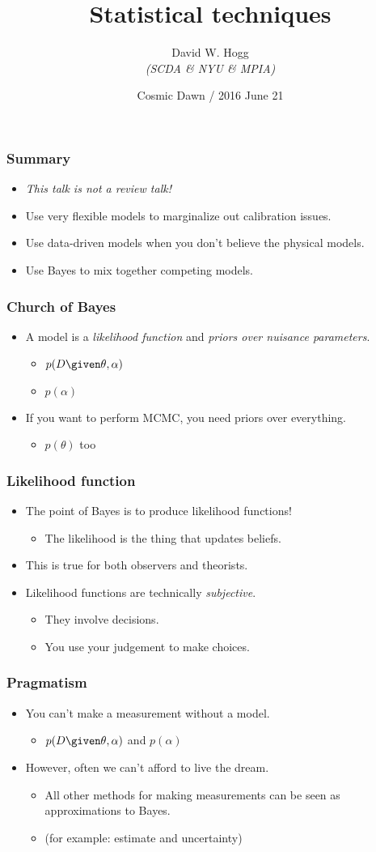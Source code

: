 \documentclass[pdftex]{beamer}
\title{Statistical techniques}
\author[David W. Hogg (NYU)]{David W. Hogg\\[1ex] {\small \textsl{(SCDA \& NYU \& MPIA)}}}
\date{Cosmic Dawn / 2016 June 21}
\newcommand{\conclusions}{%
\begin{frame}
  \frametitle{Summary}
  \begin{itemize}
  \item \textit{This talk is not a review talk!}
  \item Use very flexible models to marginalize out calibration issues.
  \item Use data-driven models when you don't believe the physical models.
  \item Use Bayes to mix together competing models.
  \end{itemize}
\end{frame}}
\begin{document}
\begin{frame}
  \titlepage
\end{frame}

\conclusions

\begin{frame}
  \frametitle{Church of Bayes}
  \begin{itemize}
  \item A model is a \emph{likelihood function} and \emph{priors over nuisance parameters}.
    \begin{itemize}
    \item $p(D\given\theta,\alpha)$
    \item $p(\alpha)$
    \end{itemize}
  \item If you want to perform MCMC, you need priors over everything.
    \begin{itemize}
    \item $p(\theta)$ too
    \end{itemize}
  \end{itemize}
\end{frame}

\begin{frame}
  \frametitle{Likelihood function}
  \begin{itemize}
  \item The point of Bayes is to produce likelihood functions!
    \begin{itemize}
    \item The likelihood is the thing that updates beliefs.
    \end{itemize}
  \item This is true for both observers and theorists.
  \item Likelihood functions are technically \emph{subjective}.
    \begin{itemize}
    \item They involve decisions.
    \item You use your judgement to make choices.
    \end{itemize}
  \end{itemize}
\end{frame}

\begin{frame}
  \frametitle{Pragmatism}
  \begin{itemize}
  \item You can't make a measurement without a model.
    \begin{itemize}
    \item $p(D\given\theta,\alpha)$ and $p(\alpha)$
    \end{itemize}
  \item However, often we can't afford to live the dream.
    \begin{itemize}
    \item All other methods for making measurements can be seen as
      approximations to Bayes.
    \item (for example: estimate and uncertainty)
    \end{itemize}
  \end{itemize}
\end{frame}
\end{document}
